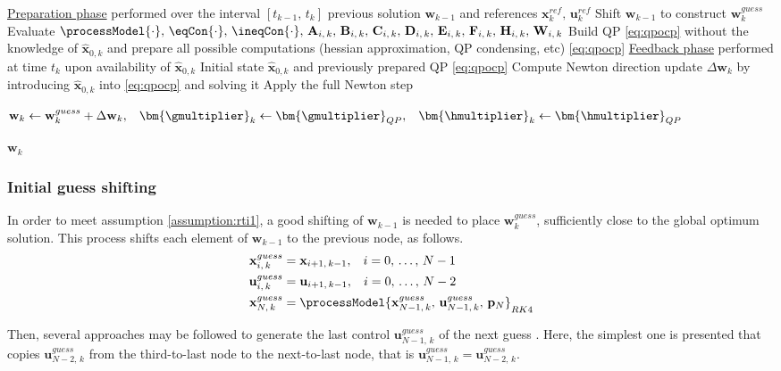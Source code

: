\begin{algorithm}[H]
	\caption{RTI}\label{alg:rti}
	\centering
	\footnotesize
	\begin{algorithmic}[1]
	\Statex \underline{Preparation phase} performed over the interval $\left[t_{k-1},\,t_k\right]$
	\Require previous solution $\mathbf{w}_{k-1}$ and references $\mathbf{x}_k^{ref},\,\mathbf{u}_k^{ref}$
	\State Shift $\mathbf{w}_{k-1}$ to construct $\mathbf{w}_k^{guess}$
	\State Evaluate $\processModel{\cdot},\, \eqCon{\cdot},\,\ineqCon{\cdot},\,\mathbf{A}_{i,\,k},\,\mathbf{B}_{i,\,k},\,\mathbf{C}_{i,\,k},\,\mathbf{D}_{i,\,k},\,\mathbf{E}_{i,\,k},\,\mathbf{F}_{i,\,k},\,\mathbf{H}_{i,\,k},\,\mathbf{W}_{i,\,k}$
	\State Build QP \eqref{eq:qpocp} without the knowledge of $\mathbf{\hat{x}}_{0, k}$ and prepare all possible computations (hessian approximation, QP condensing, etc)
	\State \Return \eqref{eq:qpocp}
	\Statex \underline{Feedback phase} performed at time $t_k$ upon availability of $\mathbf{\hat{x}}_{0, k}$
	\Require Initial state $\mathbf{\hat{x}}_{0, k}$ and previously prepared QP \eqref{eq:qpocp}
	\State Compute Newton direction update $\Delta \mathbf{w}_k$ by introducing $\mathbf{\hat{x}}_{0, k}$ into \eqref{eq:qpocp} and solving it
	\State Apply the full Newton step
	\Statex \centerline{$\mathbf{w}_k \gets \mathbf{w}_{k}^{guess} + \Delta \mathbf{w}_{k},\hspace{0.3cm}\bm{\gmultiplier}_k \gets \bm{\gmultiplier}_{QP},\hspace{0.3cm}\bm{\hmultiplier}_k \gets \bm{\hmultiplier}_{QP}$}
	\State \Return $\mathbf{w}_k$
	\end{algorithmic}
\end{algorithm}

\subsubsection*{Initial guess shifting}

In order to meet assumption \ref{assumption:rti1}, a good shifting of $\mathbf{w}_{k-1}$ is needed to place $\mathbf{w}_k^{guess}$, sufficiently close to the global optimum solution. This process shifts each element  of $\mathbf{w}_{k-1}$ to the previous node, as follows.
\begin{equation}
\begin{aligned}
\mathbf{x}_{i,\,k}^{guess} &= \mathbf{x}_{i+1,\,k-1}, \hspace{0.3cm} i = 0,\,\ldots,\,N-1\\
\mathbf{u}_{i,\,k}^{guess} &= \mathbf{u}_{i+1,\,k-1}, \hspace{0.3cm} i = 0,\,\ldots,\,N-2\\
\mathbf{x}_{N,\,k}^{guess} &= \processModel{\mathbf{x}_{N-1,\,k}^{guess},\,\mathbf{u}_{N-1,\,k}^{guess},\,\mathbf{p}_N}_{RK4}
\end{aligned}
\label{eq:shifting}
\end{equation}

Then, several approaches may be followed to generate the last control $\mathbf{u}_{N-1,\,k}^{guess}$ of the next guess \cite{gros2020linear}. Here, the simplest one is presented that copies $\mathbf{u}_{N-2,\,k}^{guess}$ from the third-to-last node to the next-to-last node, that is $\mathbf{u}_{N-1,\,k}^{guess} = \mathbf{u}_{N-2,\,k}^{guess}$.
